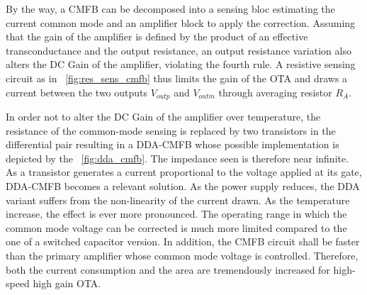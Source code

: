 By the way, a CMFB can be decomposed into a sensing bloc estimating the current common mode and an amplifier block to apply the correction. Assuming that the gain of the amplifier is defined by the product of an effective transconductance and the output resistance, an output resistance variation also alters the DC Gain of the amplifier, violating the fourth rule. A resistive sensing circuit as in \figurename~\ref{fig:res_sens_cmfb} thus limits the gain of the OTA and draws a current between the two outputs \(V_{outp}\) and \(V_{outm}\) through averaging resistor \(R_A \).

In order not to alter the DC Gain of the amplifier over temperature, the resistance of the common-mode sensing is replaced by two transistors in the differential pair resulting in a DDA-CMFB whose possible implementation is depicted by the \figurename~\ref{fig:dda_cmfb}. The impedance seen is therefore near infinite. As a transistor generates a current proportional to the voltage applied at its gate, DDA-CMFB becomes a relevant solution. As the power supply reduces, the DDA variant suffers from the non-linearity of the current drawn. As the temperature increase, the effect is ever more pronounced. The operating range in which the common mode voltage can be corrected is much more limited compared to the one of a switched capacitor version. In addition, the CMFB circuit shall be faster than the primary amplifier whose common mode voltage is controlled. Therefore, both the current consumption and the area are tremendously increased for high-speed high gain OTA\@.

